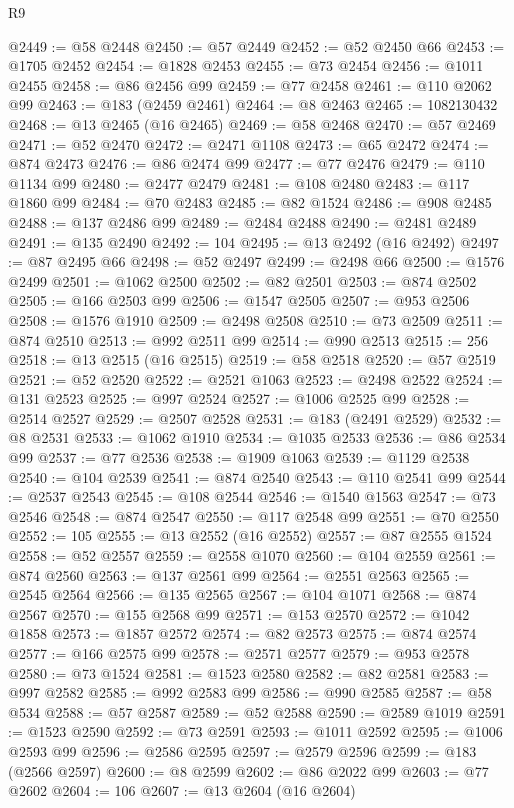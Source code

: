 \begin{lexlean}{R9}
\begin{coremodule}
@2449 := @58 @2448
@2450 := @57 @2449
@2452 := @52 @2450 @66
@2453 := @1705 @2452
@2454 := @1828 @2453
@2455 := @73 @2454
@2456 := @1011 @2455
@2458 := @86 @2456 @99
@2459 := @77 @2458
@2461 := @110 @2062 @99
@2463 := @183 (@2459 @2461)
@2464 := @8 @2463
@2465 := 1082130432
@2468 := @13 @2465 (@16 @2465)
@2469 := @58 @2468
@2470 := @57 @2469
@2471 := @52 @2470
@2472 := @2471 @1108
@2473 := @65 @2472
@2474 := @874 @2473
@2476 := @86 @2474 @99
@2477 := @77 @2476
@2479 := @110 @1134 @99
@2480 := @2477 @2479
@2481 := @108 @2480
@2483 := @117 @1860 @99
@2484 := @70 @2483
@2485 := @82 @1524
@2486 := @908 @2485
@2488 := @137 @2486 @99
@2489 := @2484 @2488
@2490 := @2481 @2489
@2491 := @135 @2490
@2492 := 104
@2495 := @13 @2492 (@16 @2492)
@2497 := @87 @2495 @66
@2498 := @52 @2497
@2499 := @2498 @66
@2500 := @1576 @2499
@2501 := @1062 @2500
@2502 := @82 @2501
@2503 := @874 @2502
@2505 := @166 @2503 @99
@2506 := @1547 @2505
@2507 := @953 @2506
@2508 := @1576 @1910
@2509 := @2498 @2508
@2510 := @73 @2509
@2511 := @874 @2510
@2513 := @992 @2511 @99
@2514 := @990 @2513
@2515 := 256
@2518 := @13 @2515 (@16 @2515)
@2519 := @58 @2518
@2520 := @57 @2519
@2521 := @52 @2520
@2522 := @2521 @1063
@2523 := @2498 @2522
@2524 := @131 @2523
@2525 := @997 @2524
@2527 := @1006 @2525 @99
@2528 := @2514 @2527
@2529 := @2507 @2528
@2531 := @183 (@2491 @2529)
@2532 := @8 @2531
@2533 := @1062 @1910
@2534 := @1035 @2533
@2536 := @86 @2534 @99
@2537 := @77 @2536
@2538 := @1909 @1063
@2539 := @1129 @2538
@2540 := @104 @2539
@2541 := @874 @2540
@2543 := @110 @2541 @99
@2544 := @2537 @2543
@2545 := @108 @2544
@2546 := @1540 @1563
@2547 := @73 @2546
@2548 := @874 @2547
@2550 := @117 @2548 @99
@2551 := @70 @2550
@2552 := 105
@2555 := @13 @2552 (@16 @2552)
@2557 := @87 @2555 @1524
@2558 := @52 @2557
@2559 := @2558 @1070
@2560 := @104 @2559
@2561 := @874 @2560
@2563 := @137 @2561 @99
@2564 := @2551 @2563
@2565 := @2545 @2564
@2566 := @135 @2565
@2567 := @104 @1071
@2568 := @874 @2567
@2570 := @155 @2568 @99
@2571 := @153 @2570
@2572 := @1042 @1858
@2573 := @1857 @2572
@2574 := @82 @2573
@2575 := @874 @2574
@2577 := @166 @2575 @99
@2578 := @2571 @2577
@2579 := @953 @2578
@2580 := @73 @1524
@2581 := @1523 @2580
@2582 := @82 @2581
@2583 := @997 @2582
@2585 := @992 @2583 @99
@2586 := @990 @2585
@2587 := @58 @534
@2588 := @57 @2587
@2589 := @52 @2588
@2590 := @2589 @1019
@2591 := @1523 @2590
@2592 := @73 @2591
@2593 := @1011 @2592
@2595 := @1006 @2593 @99
@2596 := @2586 @2595
@2597 := @2579 @2596
@2599 := @183 (@2566 @2597)
@2600 := @8 @2599
@2602 := @86 @2022 @99
@2603 := @77 @2602
@2604 := 106
@2607 := @13 @2604 (@16 @2604)

\end{coremodule}
\end{lexlean}

